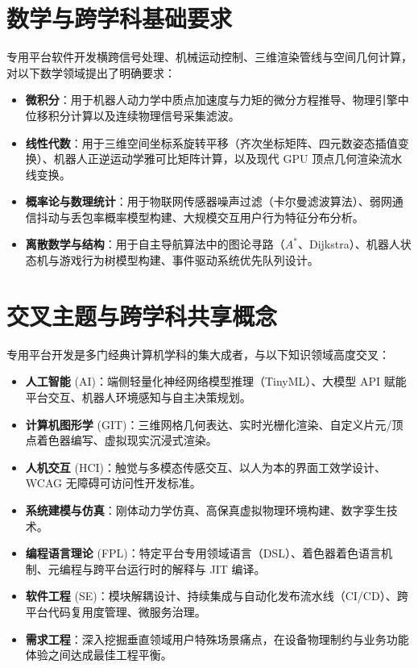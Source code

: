 \section{数学与跨学科基础要求}

专用平台软件开发横跨信号处理、机械运动控制、三维渲染管线与空间几何计算，对以下数学领域提出了明确要求：
\begin{itemize}
    \item \textbf{微积分}：用于机器人动力学中质点加速度与力矩的微分方程推导、物理引擎中位移积分计算以及连续物理信号采集滤波。
    \item \textbf{线性代数}：用于三维空间坐标系旋转平移（齐次坐标矩阵、四元数姿态插值变换）、机器人正逆运动学雅可比矩阵计算，以及现代 GPU 顶点几何渲染流水线变换。
    \item \textbf{概率论与数理统计}：用于物联网传感器噪声过滤（卡尔曼滤波算法）、弱网通信抖动与丢包率概率模型构建、大规模交互用户行为特征分布分析。
    \item \textbf{离散数学与结构}：用于自主导航算法中的图论寻路（$A^*$、Dijkstra）、机器人状态机与游戏行为树模型构建、事件驱动系统优先队列设计。
\end{itemize}

\section{交叉主题与跨学科共享概念}

专用平台开发是多门经典计算机学科的集大成者，与以下知识领域高度交叉：
\begin{itemize}
    \item \textbf{人工智能} (AI)：端侧轻量化神经网络模型推理（TinyML）、大模型 API 赋能平台交互、机器人环境感知与自主决策规划。
    \item \textbf{计算机图形学} (GIT)：三维网格几何表达、实时光栅化渲染、自定义片元/顶点着色器编写、虚拟现实沉浸式渲染。
    \item \textbf{人机交互} (HCI)：触觉与多模态传感交互、以人为本的界面工效学设计、WCAG 无障碍可访问性开发标准。
    \item \textbf{系统建模与仿真}：刚体动力学仿真、高保真虚拟物理环境构建、数字孪生技术。
    \item \textbf{编程语言理论} (FPL)：特定平台专用领域语言（DSL）、着色器着色语言机制、元编程与跨平台运行时的解释与 JIT 编译。
    \item \textbf{软件工程} (SE)：模块解耦设计、持续集成与自动化发布流水线（CI/CD）、跨平台代码复用度管理、微服务治理。
    \item \textbf{需求工程}：深入挖掘垂直领域用户特殊场景痛点，在设备物理制约与业务功能体验之间达成最佳工程平衡。
\end{itemize}

